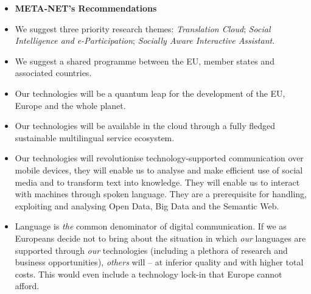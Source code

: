 \documentclass[10pt, plain]{../../metanetpaper}
\begin{document}
\begin{multicols}{2}
\begin{itemize}
  \item[] \textbf{META-NET's Recommendations}
  \item We suggest three priority research themes: \emph{Translation Cloud}; \emph{Social Intelligence and e-Participation}; \emph{Socially Aware Interactive Assistant}.
  \item We suggest a shared programme between the EU, member states and associated countries.
  \item Our technologies will be a quantum leap for the development of the EU, Europe and the whole planet.
  \item Our technologies will be available in the cloud through a fully fledged sustainable multilingual service ecosystem.
  \item Our technologies will revolutionise technology-supported communication over mobile devices, they will enable us to analyse and make efficient use of social media and to transform text into knowledge. They will enable us to interact with machines through spoken language. They are a prerequisite for handling, exploiting and analysing Open Data, Big Data and the Semantic Web.
  \item Language is \emph{the} common denominator of digital communication. If we as Europeans decide not to bring about the situation in which \emph{our} languages are supported through \emph{our} technologies (including a plethora of research and business opportunities), \emph{others} will -- at inferior quality and with higher total costs. This would even include a technology lock-in that Europe cannot afford.
  \end{itemize}
\end{multicols}


{}

%
%
%
%
\end{document}
